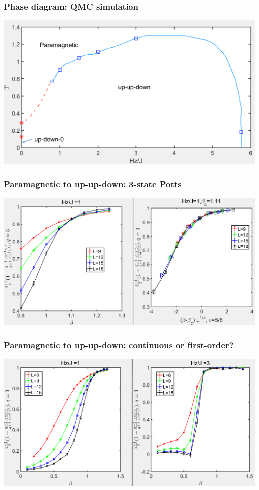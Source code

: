 \documentclass[xcolor=table, aspectratio=1610,ignorenonframetext]{beamer}
\begin{document}
\begin{frame}
  \frametitle{Phase diagram: QMC simulation}
  \begin{center}
    \includegraphics[width=\textwidth]{pd-hz-qmc}
  \end{center}
\end{frame}

\begin{frame}
  \frametitle{Paramagnetic to up-up-down: 3-state Potts}
  \begin{center}
    \includegraphics[width=.8\textwidth]{potts-scaling}
  \end{center}
\end{frame}

\begin{frame}
  \frametitle{Paramagnetic to up-up-down: continuous or first-order?}
  \begin{center}
    \includegraphics[width=.8\textwidth]{potts-fo}
  \end{center}
\end{frame}
\end{document}

